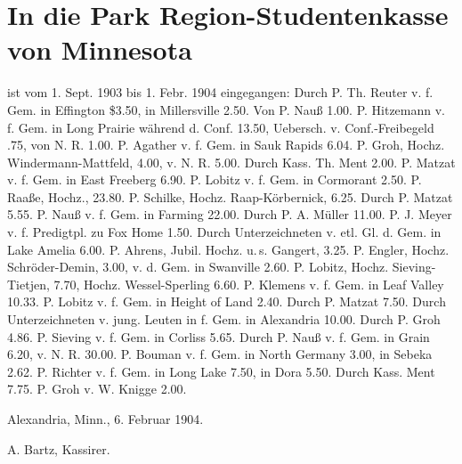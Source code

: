 \chapter[In die Park Region-Studentenkasse …]{In die Park Region-Studentenkasse von Minnesota}

ist vom 1. Sept. 1903 bis 1. Febr. 1904 eingegangen: Durch P. Th. Reuter v. f. Gem. in Effington \$3.50, in Millersville 2.50. Von P. Nauß 1.00. P. Hitzemann v. f. Gem. in Long Prairie während d. Conf. 13.50, Uebersch. v. Conf.-Freibegeld .75, von N. R. 1.00. P. Agather v. f. Gem. in Sauk Rapids 6.04. P. Groh, Hochz. Windermann-Mattfeld, 4.00, v. N. R. 5.00. Durch Kass. Th. Ment 2.00. P. Matzat v. f. Gem. in East Freeberg 6.90. P. Lobitz v. f. Gem. in Cormorant 2.50. P. Raaße, Hochz., 23.80. P. Schilke, Hochz. Raap-Körbernick, 6.25. Durch P. Matzat 5.55. P. Nauß v. f. Gem. in Farming 22.00. Durch P. A. Müller 11.00. P. J. Meyer v. f. Predigtpl. zu Fox Home 1.50. Durch Unterzeichneten v. etl. Gl. d. Gem. in Lake Amelia 6.00. P. Ahrens, Jubil. Hochz. u.\,s. Gangert, 3.25. P. Engler, Hochz. Schröder-Demin, 3.00, v. d. Gem. in Swanville 2.60. P. Lobitz, Hochz. Sieving-Tietjen, 7.70, Hochz. Wessel-Sperling 6.60. P. Klemens v. f. Gem. in Leaf Valley 10.33. P. Lobitz v. f. Gem. in Height of Land 2.40. Durch P. Matzat 7.50. Durch Unterzeichneten v. jung. Leuten in f. Gem. in Alexandria 10.00. Durch P. Groh 4.86. P. Sieving v. f. Gem. in Corliss 5.65. Durch P. Nauß v. f. Gem. in Grain 6.20, v. N. R. 30.00. P. Bouman v. f. Gem. in North Germany 3.00, in Sebeka 2.62. P. Richter v. f. Gem. in Long Lake 7.50, in Dora 5.50. Durch Kass. Ment 7.75. P. Groh v. W. Knigge 2.00.

Alexandria, Minn., 6. Februar 1904.

A. Bartz, Kassirer.
